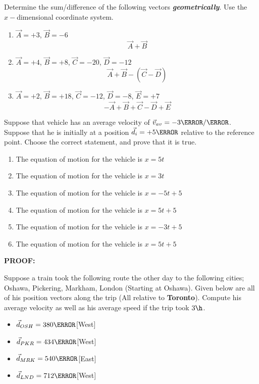 \documentclass[12pt]{article} %
\begin{document}
\begin{qstn}[4]
	Determine the sum/difference of the following vectors \textbf{\emph{geometrically}}. Use the $x-$dimensional coordinate system.
	\begin{enumerate}[label=(\alph*)]
		\item $\vec A = +3$, $\vec B = -6$ $$\vec A + \vec B$$
		\vspace*{7cm}
		\item $\vec A = +4$, $\vec B = +8$, $\vec C = -20$, $\vec D = -12$   $$\vec A + \vec B - (\vec C - \vec D)$$
		\newpage
		\item $\vec A = +2$, $\vec B = +18$, $\vec C = -12$, $\vec D = -8$, $\vec E = +7$  $$-\vec A  + \vec B + \vec C - \vec D + \vec E$$
		\vspace*{7cm}
	\end{enumerate}

\end{qstn}

\begin{qstn}[5]
Suppose that vehicle has an average velocity of $\vec v_{av} = -3 \m / \s$. Suppose that he is initially at a position $\vec d_i = +5 \m$ relative to the reference point. Choose the correct statement, and prove that it is true.
	\begin{enumerate}[label = (\alph*)]
		\item The equation of motion for the vehicle is $x = 5t$
		\item The equation of motion for the vehicle is $x = 3t$
		\item The equation of motion for the vehicle is $x = -5t + 5$
		\item The equation of motion for the vehicle is $x = 5t + 5$
		\item The equation of motion for the vehicle is $x = -3t + 5$
		\item The equation of motion for the vehicle is $x = 5t + 5$
	\end{enumerate}

	

\textbf{PROOF: }

\end{qstn}





\begin{qstn}[6]
	Suppose a train took the following route the other day to the following cities; Oshawa, Pickering, Markham, London (Starting at Oshawa). Given below are all of his position vectors along the trip (All relative to \textbf{Toronto}). Compute his average velocity as well as his average speed if the trip took $3 \h$.
	\begin{itemize}
	\item $\vec d_{OSH} = 380\km$[West]
	\item $\vec d_{PKR} = 434\km$[West]
	\item $\vec d_{MRK} = 540\km$[East]
	\item $\vec d_{LND} = 712\km$[West]
	\end{itemize}
	

\end{qstn}
\end{document}
